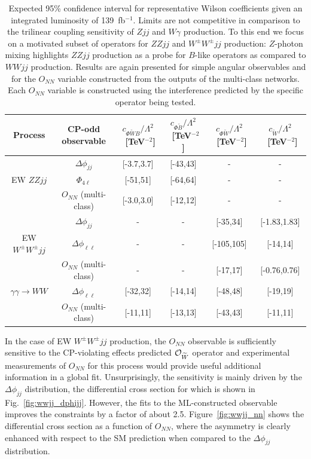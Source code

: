 \documentclass[twocolumn,preprintnumbers,superscriptaddress,nofootinbib,aps,prd,floatfix]{revtex4}
\begin{document}
\begin{table}[!t]
    \centering
    \begin{tabular}{|c|c|c|c|c|c|}
    \hline 
     Process & CP-odd observable & $c_{\Phi \widetilde{W}B} / \Lambda^2$~[TeV$^{-2}$] & $c_{ \Phi \widetilde{B}} / \Lambda^2$~[TeV$^{-2}$] & $c_{\Phi \widetilde{W}} / \Lambda^2$~[TeV$^{-2}$] & $c_{\widetilde{W}} / \Lambda^2$~[TeV$^{-2}$]\\
     \hline 
       & $\Delta\phi_{jj}$ & [-3.7,3.7] &  [-43,43] & - & - \\
     EW $ZZjj$ & $\Phi_{4\ell}$ & [-51,51] & [-64,64] & - & -  \\
       &   $O_{NN}$ (multi-class)  & [-3.0,3.0] & [-12,12] & - & - \\

     & $\Delta\phi_{jj}$ & - & - & [-35,34] & [-1.83,1.83] \\
    EW $W^\pm W^\pm jj$ & $\Delta\phi_{\ell\ell}$ & - & - & [-105,105] & [-14,14]  \\
       &   $O_{NN}$ (multi-class)  & - & - & [-17,17] & [-0.76,0.76]  \\
          \hline
    $\gamma\gamma \rightarrow WW$ & $\Delta\phi_{\ell\ell}$ & [-32,32] & [-14,14] & [-48,48] & [-19,19]  \\
       &   $O_{NN}$ (multi-class)  & [-11,11] & [-13,13] & [-43,43] & [-11,11] \\
          \hline      
    \end{tabular}
    \caption{Expected 95\% confidence interval for representative Wilson coefficients given an integrated luminosity of 139~fb$^{-1}$.
     Limits are not competitive in comparison to the trilinear coupling sensitivity of $Zjj$ and $W\gamma$ production. To this end we focus on a motivated subset of operators for $ZZjj$ and $W^\pm W^\pm jj$ production: $Z$-photon mixing highlights $ZZjj$ production as a probe for $B$-like operators as compared to $WWjj$ production. Results are again presented for simple angular observables and for the $O_{NN}$ variable constructed from the outputs of the multi-class networks. Each $O_{NN}$ variable is constructed using the interference predicted by the specific operator being tested. 
    \label{tab:vbs}}
\end{table}


In the case of EW $W^\pm W^\pm jj$ production, the $O_{NN}$ observable is sufficiently sensitive to the CP-violating effects predicted  ${\cal{O}}_{\widetilde{W}}$ operator and experimental measurements of $O_{NN}$ for this process would provide useful additional information in a global fit. Unsurprisingly, the sensitivity is mainly driven by the $\Delta \phi_{jj}$ distribution, the differential cross section for which is shown in Fig.~\ref{fig:wwjj_dphijj}. However, the fits to the ML-constructed observable improves the constraints by a factor of about 2.5. Figure~\ref{fig:wwjj_nn} shows the differential cross section as a function of $O_{NN}$, where the asymmetry is clearly enhanced with respect to the SM prediction when compared to the $\Delta\phi_{jj}$ distribution. 
\end{document}
